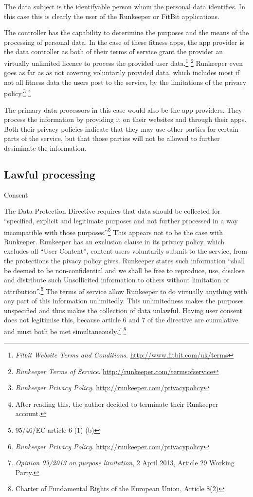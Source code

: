 \documentclass{article}
\begin{document}
The data subject is the identifyable person whom the personal data identifies.
In this case this is clearly the user of the Runkeeper or FitBit applications.

The controller has the capability to deterimine the purposes and the means of the processing of personal data.
In the case of these fitness apps, the app provider is the data controller as both of their terms of service grant the provider an virtually unlimited licence to process the provided user data.\footnote{\emph{Fitbit Website Terms and Conditions}. \url{http://www.fitbit.com/uk/terms}} \footnote{\emph{Runkeeper Terms of Service}. \url{http://runkeeper.com/termsofservice}}
Runkeeper even goes as far as as not covering voluntarily provided data, which includes most if not all fitness data the users post to the service, by the limitations of the privacy policy.\footnote{\emph{Runkeeper Privacy Policy}. \url{http://runkeeper.com/privacypolicy}} \footnote{After reading this, the author decided to terminate their Runkeeper account.}

The primary data processors in this case would also be the app providers.
They process the information by providing it on their websites and through their apps.
Both their privacy policies indicate that they may use other parties for certain parts of the service, but that those parties will not be allowed to further desiminate the information.

\subsection{Lawful processing}

Consent

The Data Protection Directive requires that data should be collected for ``specified, explicit and legitimate purposes and not further processed in a way incompatible with those purposes.''\footnote{95/46/EC article 6 (1) (b)}
This appears not to be the case with Runkeeper.
Runkeeper has an exclusion clause in its privacy policy, which excludes all ``User Content'', content users voluntarily submit to the service, from the protections the pivacy policy gives.
Runkeeper states such information ``shall be deemed to be non-confidential and we shall be free to reproduce, use, disclose and distribute such Unsollicited information to others without limitation or attribution''.\footnote{\emph{Runkeeper Privacy Policy}. \url{http://runkeeper.com/privacypolicy}}
The terms of service allow Runkeeper to do virtually anything with any part of this information unlimitedly.
This unlimitedness makes the purposes unspecified and thus makes the collection of data unlawful. Having user consent does not legitimise this, because article 6 and 7 of the directive are cumulative and must both be met simultaneously.\footnote{\emph{Opinion 03/2013 on purpose limitation}, 2 April 2013, Article 29 Working Party.} \footnote{Charter of Fundamental Rights of the European Union, Article 8(2)}
\end{document}
